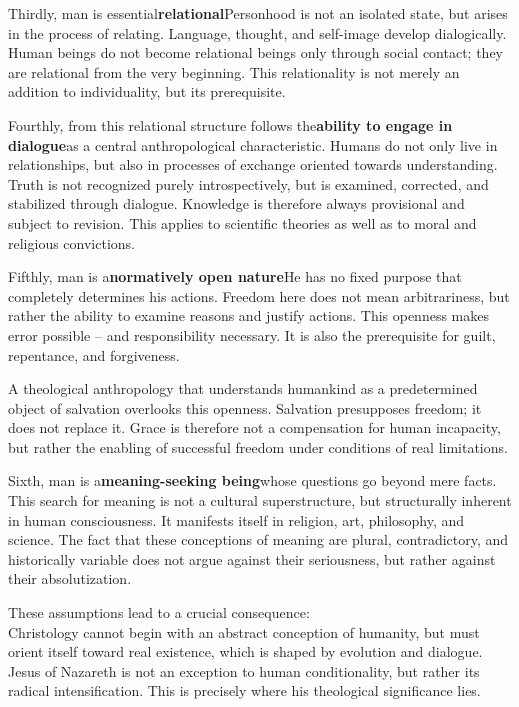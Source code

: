 \documentclass[
]{article}
\begin{document}
Thirdly, man is essential\textbf{relational}Personhood is not an isolated state, but arises in the process of relating. Language, thought, and self-image develop dialogically. Human beings do not become relational beings only through social contact; they are relational from the very beginning. This relationality is not merely an addition to individuality, but its prerequisite.

Fourthly, from this relational structure follows the\textbf{ability to engage in dialogue}as a central anthropological characteristic. Humans do not only live in relationships, but also in processes of exchange oriented towards understanding. Truth is not recognized purely introspectively, but is examined, corrected, and stabilized through dialogue. Knowledge is therefore always provisional and subject to revision. This applies to scientific theories as well as to moral and religious convictions.

Fifthly, man is a\textbf{normatively open nature}He has no fixed purpose that completely determines his actions. Freedom here does not mean arbitrariness, but rather the ability to examine reasons and justify actions. This openness makes error possible -- and responsibility necessary. It is also the prerequisite for guilt, repentance, and forgiveness.

A theological anthropology that understands humankind as a predetermined object of salvation overlooks this openness. Salvation presupposes freedom; it does not replace it. Grace is therefore not a compensation for human incapacity, but rather the enabling of successful freedom under conditions of real limitations.

Sixth, man is a\textbf{meaning-seeking being}whose questions go beyond mere facts. This search for meaning is not a cultural superstructure, but structurally inherent in human consciousness. It manifests itself in religion, art, philosophy, and science. The fact that these conceptions of meaning are plural, contradictory, and historically variable does not argue against their seriousness, but rather against their absolutization.

These assumptions lead to a crucial consequence:\\
Christology cannot begin with an abstract conception of humanity, but must orient itself toward real existence, which is shaped by evolution and dialogue. Jesus of Nazareth is not an exception to human conditionality, but rather its radical intensification. This is precisely where his theological significance lies.
\end{document}
